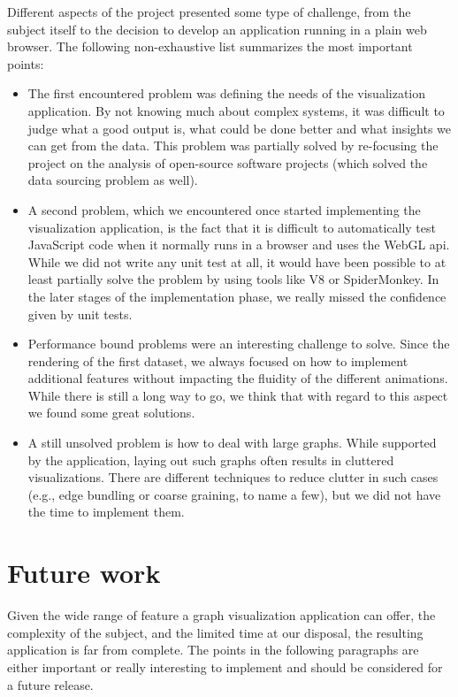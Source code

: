 Different aspects of the project presented some type of challenge, from the subject itself to the decision to develop an application running in a plain web browser. The following non-exhaustive list summarizes the most important points:

\begin{itemize}
  \item The first encountered problem was defining the needs of the visualization application. By not knowing much about complex systems, it was difficult to judge what a good output is, what could be done better and what insights we can get from the data. This problem was partially solved by re-focusing the project on the analysis of open-source software projects (which solved the data sourcing problem as well).
  \item A second problem, which we encountered once started implementing the visualization application, is the fact that it is difficult to automatically test JavaScript code when it normally runs in a browser and uses the WebGL \gls{api}. While we did not write any unit test at all, it would have been possible to at least partially solve the problem by using tools like V8 or SpiderMonkey. In the later stages of the implementation phase, we really missed the confidence given by unit tests.
  \item Performance bound problems were an interesting challenge to solve. Since the rendering of the first dataset, we always focused on how to implement additional features without impacting the fluidity of the different animations. While there is still a long way to go, we think that with regard to this aspect we found some great solutions. 
  \item A still unsolved problem is how to deal with large graphs. While supported by the application, laying out such graphs often results in cluttered visualizations. There are different techniques to reduce clutter in such cases (e.g., edge bundling or coarse graining, to name a few), but we did not have the time to implement them.
\end{itemize}

\section{Future work}
\label{sec:future}

Given the wide range of feature a graph visualization application can offer, the complexity of the subject, and the limited time at our disposal, the resulting application is far from complete. The points in the following paragraphs are either important or really interesting to implement and should be considered for a future release.

